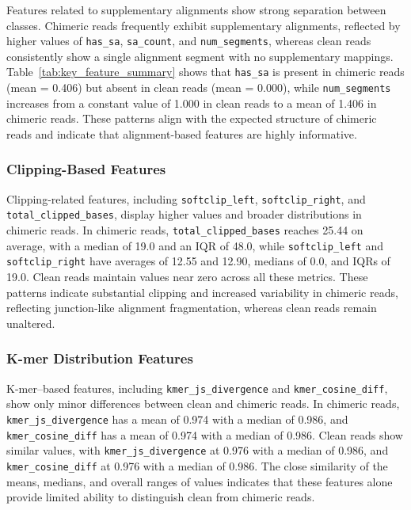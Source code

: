 Features related to supplementary alignments show strong separation between classes. Chimeric reads frequently exhibit supplementary alignments, reflected by higher values of \texttt{has\_sa}, \texttt{sa\_count}, and \texttt{num\_segments}, whereas clean reads consistently show a single alignment segment with no supplementary mappings. Table~\ref{tab:key_feature_summary} shows that \texttt{has\_sa} is present in chimeric reads (mean = 0.406) but absent in clean reads (mean = 0.000), while \texttt{num\_segments} increases from a constant value of 1.000 in clean reads to a mean of 1.406 in chimeric reads. These patterns align with the expected structure of chimeric reads and indicate that alignment-based features are highly informative.

\subsubsection{Clipping-Based Features}

Clipping-related features, including \texttt{softclip\_left}, \texttt{softclip\_right}, and \texttt{total\_clipped\_bases}, display higher values and broader distributions in chimeric reads. In chimeric reads, \texttt{total\_clipped\_bases} reaches 25.44 on average, with a median of 19.0 and an IQR of 48.0, while \texttt{softclip\_left} and \texttt{softclip\_right} have averages of 12.55 and 12.90, medians of 0.0, and IQRs of 19.0. Clean reads maintain values near zero across all these metrics. These patterns indicate substantial clipping and increased variability in chimeric reads, reflecting junction-like alignment fragmentation, whereas clean reads remain unaltered.
\subsubsection{K-mer Distribution Features}

K-mer–based features, including \texttt{kmer\_js\_divergence} and \texttt{kmer\_cosine\_diff}, show only minor differences between clean and chimeric reads. In chimeric reads, \texttt{kmer\_js\_divergence} has a mean of 0.974 with a median of 0.986, and \texttt{kmer\_cosine\_diff} has a mean of 0.974 with a median of 0.986. Clean reads show similar values, with \texttt{kmer\_js\_divergence} at 0.976 with a median of 0.986, and \texttt{kmer\_cosine\_diff} at 0.976 with a median of 0.986. The close similarity of the means, medians, and overall ranges of values indicates that these features alone provide limited ability to distinguish clean from chimeric reads.

